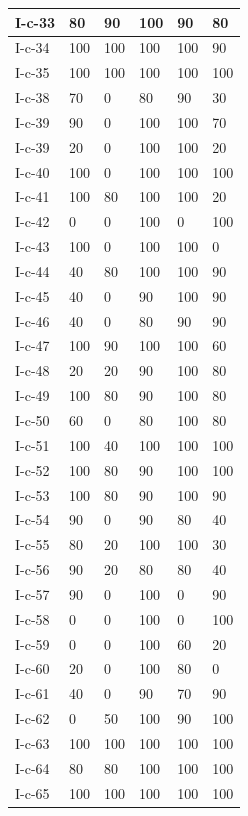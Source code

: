 \documentclass[11pt,a4paper]{article}
\begin{document}
\begin{table}[h]
\begin{tabular}{|l|l|l|l|l|l|}
I-c-33 & 80 & 90 & 100 & 90 & 80 \\ \hline
I-c-34 & 100 & 100 & 100 & 100 & 90 \\ \hline
I-c-35 & 100 & 100 & 100 & 100 & 100 \\ \hline
I-c-38 & 70 & 0 & 80 & 90 & 30 \\ \hline
I-c-39 & 90 & 0 & 100 & 100 & 70 \\ \hline
I-c-39 & 20 & 0 & 100 & 100 & 20 \\ \hline
I-c-40 & 100 & 0 & 100 & 100 & 100 \\ \hline
I-c-41 & 100 & 80 & 100 & 100 & 20 \\ \hline
I-c-42 & 0 & 0 & 100 & 0 & 100 \\ \hline
I-c-43 & 100 & 0 & 100 & 100 & 0 \\ \hline
I-c-44 & 40 & 80 & 100 & 100 & 90 \\ \hline
I-c-45 & 40 & 0 & 90 & 100 & 90 \\ \hline
I-c-46 & 40 & 0 & 80 & 90 & 90 \\ \hline
I-c-47 & 100 & 90 & 100 & 100 & 60 \\ \hline
I-c-48 & 20 & 20 & 90 & 100 & 80 \\ \hline
I-c-49 & 100 & 80 & 90 & 100 & 80 \\ \hline
I-c-50 & 60 & 0 & 80 & 100 & 80 \\ \hline
I-c-51 & 100 & 40 & 100 & 100 & 100 \\ \hline
I-c-52 & 100 & 80 & 90 & 100 & 100 \\ \hline
I-c-53 & 100 & 80 & 90 & 100 & 90 \\ \hline
I-c-54 & 90 & 0 & 90 & 80 & 40 \\ \hline
I-c-55 & 80 & 20 & 100 & 100 & 30 \\ \hline
I-c-56 & 90 & 20 & 80 & 80 & 40 \\ \hline
I-c-57 & 90 & 0 & 100 & 0 & 90 \\ \hline
I-c-58 & 0 & 0 & 100 & 0 & 100 \\ \hline
I-c-59 & 0 & 0 & 100 & 60 & 20 \\ \hline
I-c-60 & 20 & 0 & 100 & 80 & 0 \\ \hline
I-c-61 & 40 & 0 & 90 & 70 & 90 \\ \hline
I-c-62 & 0 & 50 & 100 & 90 & 100 \\ \hline
I-c-63 & 100 & 100 & 100 & 100 & 100 \\ \hline
I-c-64 & 80 & 80 & 100 & 100 & 100 \\ \hline
I-c-65 & 100 & 100 & 100 & 100 & 100 \\ \hline

\end{tabular}
\end{table}
\end{document}
